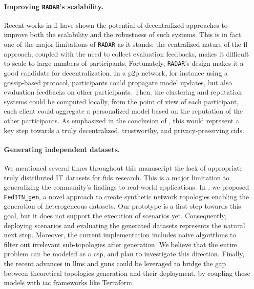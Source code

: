 \paragraph{Improving \texttt{RADAR}'s scalability.}

Recent works in \gls{fl} have shown the potential of decentralized approaches to improve both the scalability and the robustness of such systems.
This is in fact one of the major limitations of \texttt{RADAR} as it stands: the centralized nature of the \gls{fl} approach, coupled with the need to collect evaluation feedbacks, makes it difficult to scale to large numbers of participants.
Fortunately, \texttt{RADAR}'s design makes it a good candidate for decentralization.
In a \gls{p2p} network, for instance using a gossip-based protocol, participants could propagate model updates, but also evaluation feedbacks on other participants.
Then, the clustering and reputation systems could be computed locally, from the point of view of each participant, each client could aggregate a personalized model based on the reputation of the other participants.
As emphasized in the conclusion of , this would represent a key step towards a truly decentralized, trustworthy, and privacy-preserving \gls{cids}.


\paragraph{Generating independent datasets.}

We mentioned several times throughout this manuscript the lack of appropriate truly distributed IT datasets for \gls{fids} research.
This is a major limitation to generalizing the community's findings to real-world applications.
In , we proposed \verb|FedITN_gen|, a novel approach to create synthetic network topologies enabling the generation of heterogeneous datasets.
Our prototype is a first step towards this goal, but it does not support the execution of scenarios yet.
Consequently, deploying scenarios and evaluating the generated datasets represents the natural next step.
Moreover, the current implementation includes naive algorithms to filter out irrelevant sub-topologies after generation.
We believe that the entire problem can be modeled as a \gls{csp}, and plan to investigate this direction.
Finally, the recent advances in \glspl{llm} and \glspl{gnn} could be leveraged to bridge the gap between theoretical topologies generation and their deployment, by coupling these models with \gls{iac} frameworks like Terraform.


